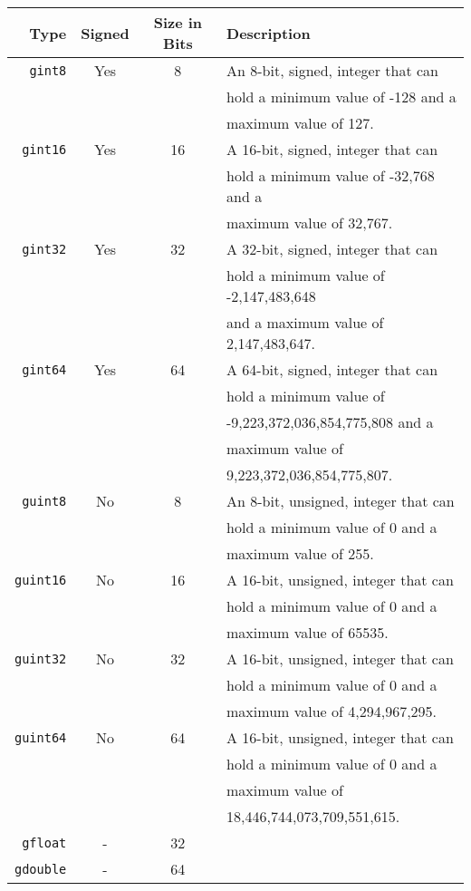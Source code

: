 \begin{tabular}{ r | c | c | l }
\hline
Type & Signed & Size in Bits & Description \\
\hline
\verb|gint8| & Yes & 8 &
An 8-bit, signed, integer that can \\
&&& hold a minimum value of -128 and a \\
&&& maximum value of 127. \\
\hline
\verb|gint16| & Yes & 16 &
A 16-bit, signed, integer that can \\
&&& hold a minimum value of -32,768 and a \\
&&& maximum value of 32,767. \\
\hline
\verb|gint32| & Yes & 32 &
A 32-bit, signed, integer that can \\
&&& hold a minimum value of -2,147,483,648 \\
&&& and a maximum value of 2,147,483,647. \\
\hline
\verb|gint64| & Yes & 64 &
A 64-bit, signed, integer that can \\
&&& hold a minimum value of \\
&&& -9,223,372,036,854,775,808 and a \\
&&& maximum value of \\
&&& 9,223,372,036,854,775,807. \\
\hline
\verb|guint8| & No & 8 &
An 8-bit, unsigned, integer that can \\
&&& hold a minimum value of 0 and a \\
&&& maximum value of 255. \\
\hline
\verb|guint16| & No & 16 &
A 16-bit, unsigned, integer that can \\
&&& hold a minimum value of 0 and a \\
&&& maximum value of 65535. \\
\hline
\verb|guint32| & No & 32 &
A 16-bit, unsigned, integer that can \\
&&& hold a minimum value of 0 and a \\
&&& maximum value of 4,294,967,295. \\
\hline
\verb|guint64| & No & 64 &
A 16-bit, unsigned, integer that can \\
&&& hold a minimum value of 0 and a \\
&&& maximum value of \\
&&& 18,446,744,073,709,551,615. \\
\hline
\verb|gfloat| & - & 32 & \\
\hline
\verb|gdouble| & - & 64 & \\
\hline
\end{tabular}

